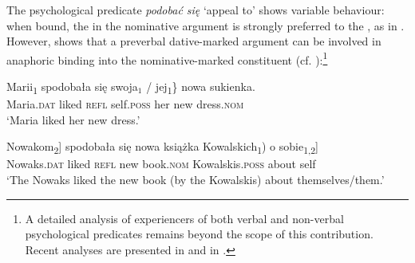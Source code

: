 \documentclass[output=paper,nonflat,colorlinks,citecolor=brown,newtxmath]{langsci/langscibook}
\begin{document}
\noindent The psychological predicate \textit{podobać się} ‘appeal to’ shows variable behaviour: when bound, the   in the nominative argument is strongly preferred to the  , as in . However, \cite{witkos2007,witkos2008} shows that a preverbal dative-marked argument can be involved in anaphoric binding into the nominative-marked constituent (cf. ):\footnote{\label{fn1}A detailed analysis of  experiencers of both verbal and non-verbal psychological predicates remains beyond the scope of this contribution. Recent analyses are presented in \cite{jimenezfernandez2016} and in \cite{bondaruk2017}.}




\ea \label{ex:witkos:3}
    \gll Marii\textsubscript{1} spodobała się  swoja$_1$ / jej\textsubscript{1}\}  nowa sukienka.\\
         Maria.\textsc{dat} liked \textsc{refl} {} self.\textsc{poss} {} her new dress.\textsc{nom}\\
    \glt `Maria liked her new dress.'
\z

\ea \label{ex:witkos:4}
    \gll \minsp{[} Nowakom\textsubscript{2}]   spodobała   się   \minsp{[} nowa książka  \minsp{(} Kowalskich\textsubscript{1}) o sobie\textsubscript{1,2}]\\
        {} Nowaks.\textsc{dat} liked \textsc{refl} {} new book.\textsc{nom} {} Kowalskis.\textsc{poss} about self\\
    \glt `The Nowaks liked the new book (by the Kowalskis) about themselves/them.'
\z
\end{document}
